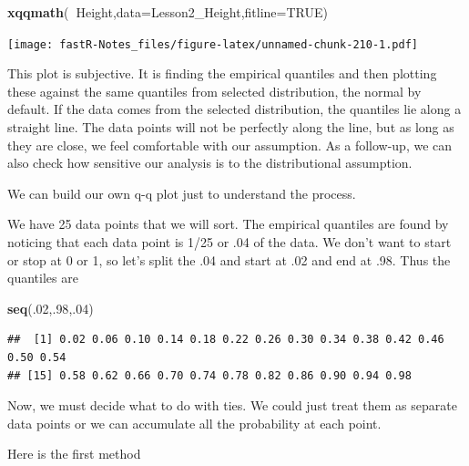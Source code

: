 \documentclass[]{book}
\newenvironment{Shaded}{\begin{snugshade}}{\end{snugshade}}
\newcommand{\KeywordTok}[1]{\textcolor[rgb]{0.13,0.29,0.53}{\textbf{#1}}}
\newcommand{\DataTypeTok}[1]{\textcolor[rgb]{0.13,0.29,0.53}{#1}}
\newcommand{\DecValTok}[1]{\textcolor[rgb]{0.00,0.00,0.81}{#1}}
\newcommand{\StringTok}[1]{\textcolor[rgb]{0.31,0.60,0.02}{#1}}
\newcommand{\OtherTok}[1]{\textcolor[rgb]{0.56,0.35,0.01}{#1}}
\newcommand{\OperatorTok}[1]{\textcolor[rgb]{0.81,0.36,0.00}{\textbf{#1}}}
\newcommand{\NormalTok}[1]{#1}
\theoremstyle{definition}
\theoremstyle{definition}
\theoremstyle{definition}
\theoremstyle{remark}
\begin{document}
\begin{Shaded}
\begin{Highlighting}[]
\KeywordTok{xqqmath}\NormalTok{(}\OperatorTok{~}\NormalTok{Height,}\DataTypeTok{data=}\NormalTok{Lesson2_Height,}\DataTypeTok{fitline=}\OtherTok{TRUE}\NormalTok{)}
\end{Highlighting}
\end{Shaded}

\texttt{[image: fastR-Notes\_files/figure-latex/unnamed-chunk-210-1.pdf]}

This plot is subjective. It is finding the empirical quantiles and then
plotting these against the same quantiles from selected distribution,
the normal by default. If the data comes from the selected distribution,
the quantiles lie along a straight line. The data points will not be
perfectly along the line, but as long as they are close, we feel
comfortable with our assumption. As a follow-up, we can also check how
sensitive our analysis is to the distributional assumption.

We can build our own q-q plot just to understand the process.

We have 25 data points that we will sort. The empirical quantiles are
found by noticing that each data point is 1/25 or .04 of the data. We
don't want to start or stop at 0 or 1, so let's split the .04 and start
at .02 and end at .98. Thus the quantiles are

\begin{Shaded}
\begin{Highlighting}[]
 \KeywordTok{seq}\NormalTok{(.}\DecValTok{02}\NormalTok{,.}\DecValTok{98}\NormalTok{,.}\DecValTok{04}\NormalTok{)}
\end{Highlighting}
\end{Shaded}

\begin{verbatim}
##  [1] 0.02 0.06 0.10 0.14 0.18 0.22 0.26 0.30 0.34 0.38 0.42 0.46 0.50 0.54
## [15] 0.58 0.62 0.66 0.70 0.74 0.78 0.82 0.86 0.90 0.94 0.98
\end{verbatim}

Now, we must decide what to do with ties. We could just treat them as
separate data points or we can accumulate all the probability at each
point.

Here is the first method

\begin{Shaded}
\end{Shaded}
\end{document}
